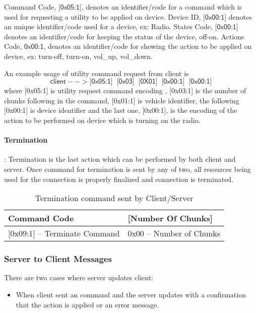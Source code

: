 \textsf{Command Code}, $\textsf{[0x05:1]}$, denotes an identifier/code for a command which is used for requesting a utility to be applied on device. \textsf{Device ID}, $\textsf{[0x00:1]}$ denotes an unique identifier/code used for a device, ex: \textsf{Radio}. \textsf{States Code}, $\textsf{[0x00:1]}$ denotes an identifier/code for keeping the status of the device, \textsf{off-on}. \textsf{Actions Code}, $\textsf{0x00:1}$, denotes an identifier/code for showing the action to be applied on device, ex: \textsf{turn-off, turn-on, vol\_up, vol\_down}.  


An example usage of utility command request from client is
\[\textsf{client} --> \textsf{[0x05:1]} \;\; \textsf{[0x03]} \;\; \textsf{[0X01]} \;\;  \textsf{[0x00:1]}   \;\;  \textsf{[0x00:1]}\]
where \textsf{[0x05:1]} is utility request command encoding , \textsf{[0x03:1]} is the number of chunks following in the command, \textsf{[0x01:1]} is vehicle identifier, the following  \textsf{[0x00:1]} is device identifier and the last one,  \textsf{[0x00:1]}, is the encoding of the action to be performed on device which is turning on the radio.

\paragraph{Termination}: Termination is the last action which can be performed by both client and server. Once command for termination is sent by any of two, all resources being used for the connection is properly finalized and connection is terminated.

\begin{table}[ht!]
  \centering
  \begin{tabular}{l l}
\hline
\textbf{Command Code} & \textbf{[Number Of Chunks]}\\
\hline
\hline
\textsf{[0x09:1]} -- Terminate Command & \textsf{0x00} -- Number of Chunks  \\
\hline
\hline
\end{tabular}
\caption{Termination command sent by Client/Server}
\end{table}

\subsubsection{Server to Client Messages}
\label{sec:pdus:pdu:s_to_c}
There are two cases where server updates client:
\begin{itemize}
\item When client sent an command and the server updates with a confirmation that the action is applied or an error message.
  \end{itemize}

